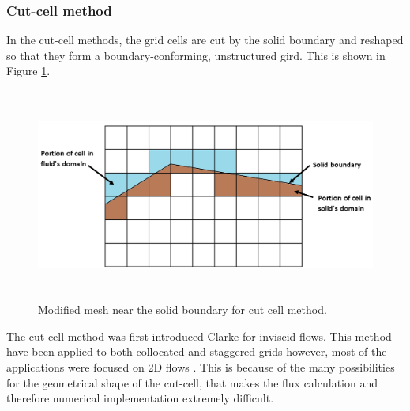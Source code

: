 \subsubsection{Cut-cell method}
In the cut-cell methods, the grid cells are cut by the solid boundary and reshaped so that they form a boundary-conforming, unstructured gird. This is shown in Figure \ref{fig:C1_cutCellMesh}.

\begin{figure}[h]
	\centering
	\includegraphics[height=7.0cm]{Chapter_1/figure/cut_cell_mesh}
	\caption{Modified mesh near the solid boundary for cut cell method.}
	\label{fig:C1_cutCellMesh}
\end{figure}

The cut-cell method was first introduced Clarke \cite{clarke1986euler} for inviscid flows. This method have been applied to both collocated and staggered grids \cite{kirkpatrick2003representation} however, most of the applications were focused on 2D flows \cite{hu2006conservative, udaykumar1999computation}. This is because of the many possibilities for the geometrical shape of the cut-cell, that makes the flux calculation and therefore numerical implementation extremely difficult.

